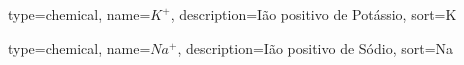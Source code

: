 
%


{%
  type=chemical,%
  name={$K^+$},%
  description={Ião positivo de Potássio},%
  sort={K}%
} 

{%
  type=chemical,%
  name={$Na^+$},%
  description={Ião positivo de Sódio},%
  sort={Na}%
} 
